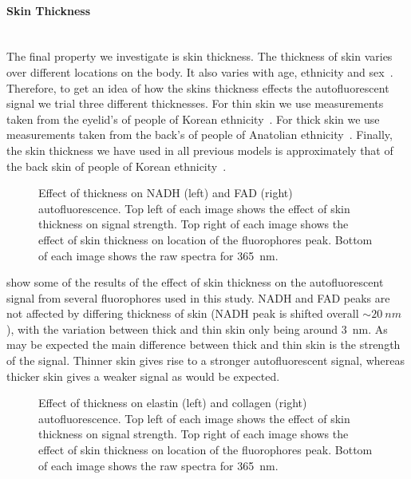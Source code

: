 \FloatBarrier
\paragraph*{Skin Thickness}\hspace{0pt}\\
The final property we investigate is skin thickness.
The thickness of skin varies over different locations on the body.
It also varies with age, ethnicity and sex~\cite{lee2002skin,oltulu2018measurement,southwood1955thickness}.
Therefore, to get an idea of how the skins thickness effects the autofluorescent signal we trial three different thicknesses.
For thin skin we use measurements taken from the eyelid's of people of Korean ethnicity~\cite{lee2002skin}.
For thick skin we use measurements taken from the back's of people of Anatolian ethnicity~\cite{oltulu2018measurement}.
Finally, the skin thickness we have used in all previous models is approximately that of the back skin of people of Korean ethnicity~\cite{lee2002skin}.

\begin{figure}[!htbp]
    \centering
    \caption{Effect of thickness on NADH (left) and FAD (right) autofluorescence. Top left of each image shows the effect of skin thickness on signal strength. Top right of each image shows the effect of skin thickness on location of the fluorophores peak. Bottom of each image shows the raw spectra for 365~nm.}%
    \label{fig:nadhfad-thick}%
\end{figure}

 show some of the results of the effect of skin thickness on the autofluorescent signal from several fluorophores used in this study.
NADH and FAD peaks are not affected by differing thickness of skin (NADH peak is shifted overall $\sim20~nm$), with the variation between thick and thin skin only being around 3~nm.
As may be expected the main difference between thick and thin skin is the strength of the signal.
Thinner skin gives rise to a stronger autofluorescent signal, whereas thicker skin gives a weaker signal as would be expected.

\begin{figure}[!htbp]
    \centering
    \caption{Effect of thickness on elastin (left) and collagen (right) autofluorescence. Top left of each image shows the effect of skin thickness on signal strength. Top right of each image shows the effect of skin thickness on location of the fluorophores peak. Bottom of each image shows the raw spectra for 365~nm.}%
    \label{fig:elscol-thick}%
\end{figure}


